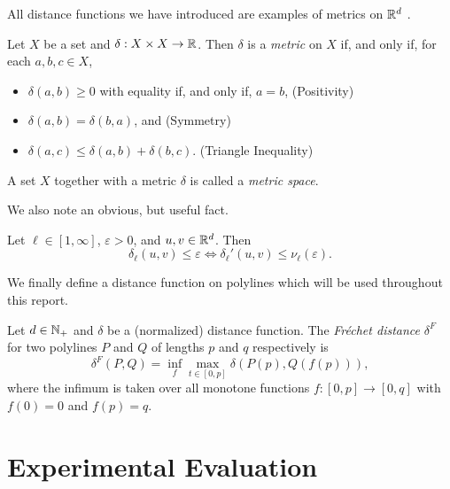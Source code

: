 All distance functions we have introduced are examples of metrics on \(\mathbb{R}^d\) \cite{metric_spaces}.

\begin{definition}\label{def:metric}
  Let \(X\) be a set and \(\delta:X\times X \to \mathbb{R}\). Then \(\delta\) is a \emph{metric} on \(X\) if, and only if, for each \(a, b, c \in X\), 
  \begin{itemize}
    \item \(\delta(a, b) \geq 0\) with equality if, and only if, \(a = b\), \hfill (Positivity)
    \item \(\delta(a, b) = \delta(b, a)\), and \hfill (Symmetry)
    \item \(\delta(a, c) \leq \delta(a, b) + \delta(b, c)\). \hfill (Triangle Inequality)
  \end{itemize}

  A set \(X\) together with a metric \(\delta\) is called a \emph{metric space}.
\end{definition}

We also note an obvious, but useful fact.  
\begin{observation}\label{obs:unnormalize}
  Let \(\ell \in [1, \infty]\), \(\varepsilon > 0\), and \(u, v \in \mathbb{R}^d\). Then 
    \[\delta_\ell(u, v) \leq \varepsilon \iff \delta_\ell'(u, v) \leq \nu_\ell(\varepsilon).\]
\end{observation}

We finally define a distance function on polylines which will be used throughout this report. 

\begin{definition}
  Let \(d \in \mathbb{N}_+\) and \(\delta\) be a (normalized) distance function. The \emph{Fréchet distance} \(\delta^F\) for two polylines \(P\) and \(Q\) of lengths \(p\) and \(q\) respectively is 
  \[\delta^F(P, Q) = \inf_f \max_{t \in [0, p]}\delta(P(p), Q(f(p))),\]
  where the infimum is taken over all monotone functions \(f:[0,p] \to [0, q]\) with \(f(0) = 0\) and \(f(p) = q\).
\end{definition}






\section{Experimental Evaluation}
\label{sec:evaluation}
%
%
